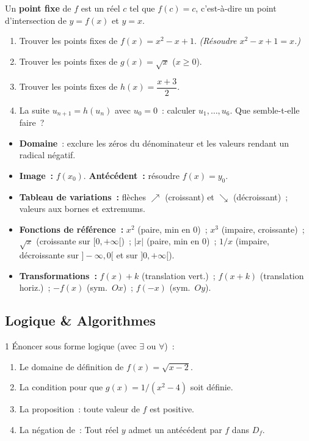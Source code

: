 \begin{challenge}
Un \textbf{point fixe} de $f$ est un r\'eel $c$ tel que $f(c)=c$,
c'est-\`a-dire un point d'intersection de $y=f(x)$ et $y=x$.
\begin{enumerate}
  \item Trouver les points fixes de $f(x)=x^2-x+1$.
        \emph{(R\'esoudre $x^2-x+1=x$.)}
  \item Trouver les points fixes de $g(x)=\sqrt{x}$ ($x\geq0$).
  \item Trouver les points fixes de $h(x)=\dfrac{x+3}{2}$.
  \item La suite $u_{n+1}=h(u_n)$ avec $u_0=0$~: calculer $u_1,\ldots,u_6$.
        Que semble-t-elle faire~?
\end{enumerate}
\end{challenge}

\begin{bilan}
\begin{itemize}
  \item \textbf{Domaine}~: exclure les z\'eros du d\'enominateur
        et les valeurs rendant un radical n\'egatif.
  \item \textbf{Image~:} $f(x_0)$. \textbf{Ant\'ec\'edent~:} r\'esoudre $f(x)=y_0$.
  \item \textbf{Tableau de variations~:} fl\`eches $\nearrow$ (croissant)
        et $\searrow$ (d\'ecroissant)~; valeurs aux bornes et extremums.
  \item \textbf{Fonctions de r\'ef\'erence~:}
        $x^2$ (paire, min en 0)~; $x^3$ (impaire, croissante)~;
        $\sqrt{x}$ (croissante sur $[0,+\infty[$)~;
        $|x|$ (paire, min en 0)~; $1/x$ (impaire, d\'ecroissante sur $]-\infty,0[$ et sur $]0,+\infty[$).
  \item \textbf{Transformations~:} $f(x)+k$ (translation vert.)~;
        $f(x+k)$ (translation horiz.)~; $-f(x)$ (sym.\ $Ox$)~;
        $f(-x)$ (sym.\ $Oy$).
\end{itemize}
\end{bilan}

\subsection*{Logique \& Algorithmes}

\begin{exo}{1}
\'Enoncer sous forme logique (avec $\exists$ ou $\forall$)~:
\begin{enumerate}
  \item Le domaine de d\'efinition de $f(x)=\sqrt{x-2}$.
  \item La condition pour que $g(x)=1/(x^2-4)$ soit d\'efinie.
  \item La proposition~: \og toute valeur de $f$ est positive\fg.
  \item La n\'egation de~: \og Tout r\'eel $y$ admet un ant\'ec\'edent par $f$ dans $D_f$\fg.
\end{enumerate}
\end{exo}

